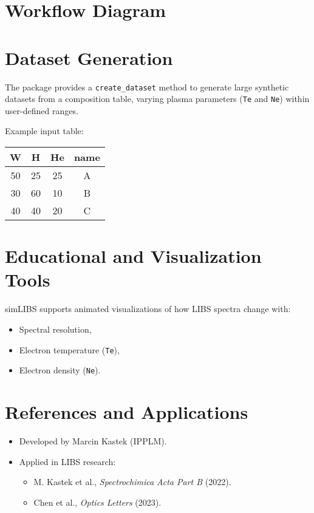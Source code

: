 \documentclass[12pt,a4paper]{article}
\begin{document}
	\section{Workflow Diagram}
	

	
	\section{Dataset Generation}
	The package provides a \texttt{create\_dataset} method to generate large synthetic datasets from a composition table, varying plasma parameters (\texttt{Te} and \texttt{Ne}) within user-defined ranges.
	
	Example input table:
	
	\begin{center}
		\begin{tabular}{cccc}
			\toprule
			W & H & He & name \\
			\midrule
			50 & 25 & 25 & A \\
			30 & 60 & 10 & B \\
			40 & 40 & 20 & C \\
			\bottomrule
		\end{tabular}
	\end{center}
	
	\section{Educational and Visualization Tools}
	simLIBS supports animated visualizations of how LIBS spectra change with:
	\begin{itemize}
		\item Spectral resolution,
		\item Electron temperature (\texttt{Te}),
		\item Electron density (\texttt{Ne}).
	\end{itemize}
	
	\section{References and Applications}
	\begin{itemize}
		\item Developed by Marcin Kastek (IPPLM).
		\item Applied in LIBS research:
		\begin{itemize}
			\item M. Kastek et al., \textit{Spectrochimica Acta Part B} (2022).
			\item Chen et al., \textit{Optics Letters} (2023).
		\end{itemize}
	\end{itemize}
	
\end{document}
